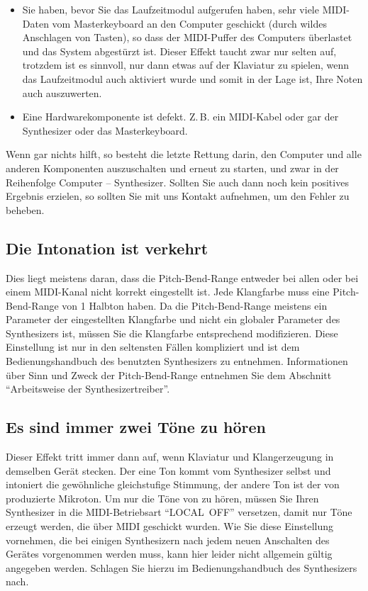 \begin{itemize}
\item Sie haben, bevor Sie das Laufzeitmodul aufgerufen haben, sehr
  viele MIDI-Daten vom Masterkeyboard an den Computer geschickt (durch
  wildes Anschlagen von Tasten), so dass der MIDI-Puffer des Computers
  überlastet und das System abgestürzt ist. Dieser Effekt taucht zwar
  nur selten auf, trotzdem ist es sinnvoll, nur dann etwas auf der
  Klaviatur zu spielen, wenn das Laufzeitmodul auch aktiviert wurde
  und somit in der Lage ist, Ihre Noten auch auszuwerten.

\item Eine Hardwarekomponente ist defekt. Z.\,B. ein MIDI-Kabel oder gar
  der Synthesizer oder das Masterkeyboard.

\end{itemize}

Wenn gar nichts hilft, so besteht die letzte Rettung darin, den
Computer und alle anderen Komponenten auszuschalten und erneut zu
starten, und zwar in der Reihenfolge Computer -- Synthesizer. Sollten
Sie auch dann noch kein positives Ergebnis erzielen, so sollten Sie
mit uns Kontakt aufnehmen, um den Fehler zu beheben.

\subsection{Die Intonation ist verkehrt}\label{sec:die-intonation-ist}
Dies liegt meistens daran, dass die Pitch-Bend-Range entweder bei allen 
oder bei einem MIDI-Kanal nicht korrekt eingestellt ist. Jede Klangfarbe 
muss eine Pitch-Bend-Range von 1 Halbton haben. Da die Pitch-Bend-Range 
meistens ein Parameter der eingestellten Klangfarbe und nicht ein globaler 
Parameter des Synthesizers ist, müssen Sie die Klangfarbe entsprechend 
modifizieren. Diese Einstellung ist nur in den seltensten Fällen 
kompliziert und ist dem Bedienungshandbuch des benutzten Synthesizers zu 
entnehmen. Informationen über Sinn und Zweck der Pitch-Bend-Range 
entnehmen Sie dem Abschnitt "`Arbeitsweise der Synthesizertreiber"'.

\subsection{Es sind immer zwei Töne zu hören}\label{sec:es-sind-immer}

Dieser Effekt tritt immer dann auf, wenn Klaviatur und Klangerzeugung in 
demselben Gerät stecken. Der eine Ton kommt vom Synthesizer selbst und 
intoniert die gewöhnliche gleichstufige Stimmung, der andere Ton ist 
der von \mutabor{} produzierte Mikroton. Um nur die Töne von \mutabor{} zu 
hören, müssen Sie Ihren Synthesizer in die MIDI-Betriebsart "`LOCAL~OFF"' 
versetzen, damit nur Töne erzeugt werden, die über MIDI geschickt wurden. 
Wie Sie diese Einstellung vornehmen, die bei einigen Synthesizern nach 
jedem neuen Anschalten des Gerätes vorgenommen werden muss, kann hier 
leider nicht allgemein gültig angegeben werden. Schlagen Sie hierzu im 
Bedienungshandbuch des Synthesizers nach.

